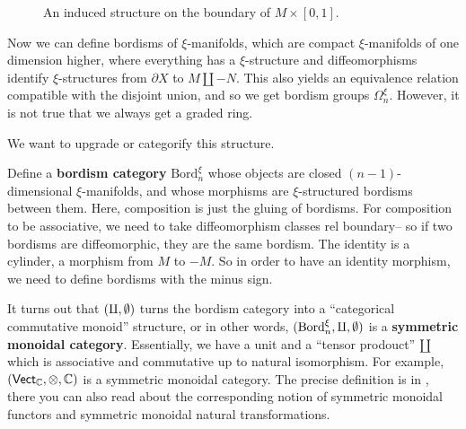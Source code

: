         \begin{figure}[H]
        \centering
        \caption{An induced structure on the boundary of $M \times [0,1]$.}
        \label{ind}
        \end{figure}
Now we can define bordisms of $\xi$-manifolds, which are compact $\xi$-manifolds of one dimension higher, where everything has a $\xi$-structure and diffeomorphisms identify $\xi$-structures from $\partial X$ to $M \amalg -N$. This also yields an equivalence relation compatible with the disjoint union, and so we get bordism groups $\Omega^{\xi}_n $. However, it is not true that we always get a graded ring.

We want to upgrade or categorify this structure. 

\begin{definition}[]
Define a \textbf{bordism category} $\mathrm{Bord}_n ^{\xi}$ whose objects are closed $(n-1)$-dimensional $\xi$-manifolds, and whose morphisms are $\xi$-structured bordisms between them. Here, composition is just the gluing of bordisms. For composition to be associative, we need to take diffeomorphism classes rel boundary-- so if two bordisms are diffeomorphic, they are the same bordism. The identity is a cylinder, a morphism from $M$ to $-M$. So in order to have an identity morphism, we need to define bordisms with the minus sign.
\end{definition}
It turns out that $(\amalg, \emptyset)$ turns the bordism category into a ``categorical commutative monoid'' structure, or in other words, $(\mathrm{Bord}_n ^{\xi},\amalg, \emptyset)$ is a \textbf{symmetric monoidal category}. Essentially, we have a unit and a ``tensor prodouct'' $\amalg$ which is associative and commutative up to natural isomorphism. For example, $(\mathsf{Vect}_{\mathbb{C}} ,\otimes,\mathbb{C})$ is a symmetric monoidal category. The precise definition is in \cite{mac}, there you can also read about the corresponding notion of symmetric monoidal functors and symmetric monoidal natural transformations.

